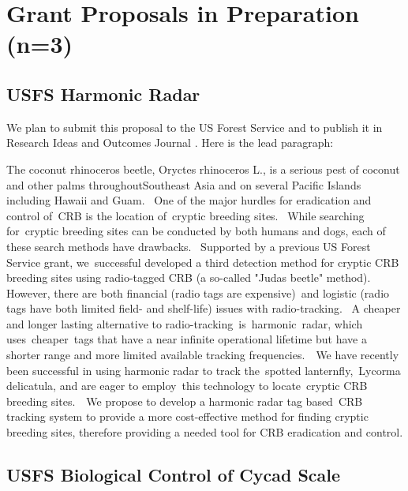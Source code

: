 \newpage

\section{Grant Proposals in Preparation (n=3)}

\subsection{USFS Harmonic Radar}
\label{harmonic radio}
\begin{refsection}

We plan to submit this proposal to the US Forest Service and to publish it in Research Ideas and Outcomes Journal \cite{moore_improving_nodate}. Here is the lead paragraph:

The coconut rhinoceros beetle, Oryctes rhinoceros L., is a serious pest of coconut and other palms throughoutSoutheast Asia and on several Pacific Islands including Hawaii and Guam.  One of the major hurdles for eradication and control of CRB is the location of cryptic breeding sites.  While searching for cryptic breeding sites can be conducted by both humans and dogs, each of these search methods have drawbacks.  Supported by a previous US Forest Service grant, we successful developed a third detection method for cryptic CRB breeding sites using radio-tagged CRB (a so-called "Judas beetle" method).  However, there are both financial (radio tags are expensive) and logistic (radio tags have both limited field- and shelf-life) issues with radio-tracking.  A cheaper and longer lasting alternative to radio-tracking is harmonic radar, which uses cheaper tags that have a near infinite operational lifetime but have a shorter range and more limited available tracking frequencies.  We have recently been successful in using harmonic radar to track the spotted lanternfly, Lycorma delicatula, and are eager to employ this technology to locate cryptic CRB breeding sites.  We propose to develop a harmonic radar tag based CRB tracking system to provide a more cost-effective method for finding cryptic breeding sites, therefore providing a needed tool for CRB eradication and control.

\printbibliography[heading=none]
\end{refsection}

\subsection{USFS Biological Control of Cycad Scale}
\label{cycad scale}

